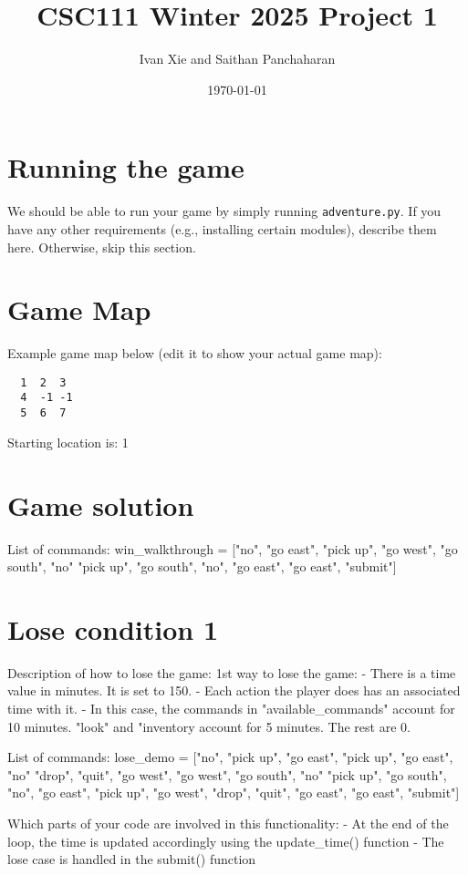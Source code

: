 \documentclass[11pt]{article}
\title{CSC111 Winter 2025 Project 1}
\author{Ivan Xie and Saithan Panchaharan}
\date{\today}
\begin{document}
\maketitle

\section*{Running the game}
We should be able to run your game by simply running \texttt{adventure.py}. If you have any other requirements (e.g., installing certain modules), describe them here. Otherwise, skip this section.

\section*{Game Map}
Example game map below (edit it to show your actual game map):

\begin{verbatim}
  1  2  3
  4  -1 -1
  5  6  7
\end{verbatim}

Starting location is: 1

\section*{Game solution}
List of commands: win_walkthrough = ["no", "go east", "pick up", "go west", "go south", "no"
                       "pick up", "go south", "no", "go east", "go east", "submit"]

\section*{Lose condition 1}
Description of how to lose the game:
1st way to lose the game:
    - There is a time value in minutes. It is set to 150.
    - Each action the player does has an associated time with it.
    - In this case, the commands in "available_commands" account for 10 minutes. "look" and "inventory account for 5 minutes. The rest are 0.

List of commands: lose_demo = ["no", "pick up", "go east", "pick up", "go east", "no"
                 "drop", "quit", "go west", "go west", "go south", "no"
                 "pick up", "go south", "no", "go east", "pick up",
                 "go west", "drop", "quit", "go east", "go east", "submit"]

Which parts of your code are involved in this functionality:
    - At the end of the loop, the time is updated accordingly using the update_time() function
    - The lose case is handled in the submit() function
\end{document}
